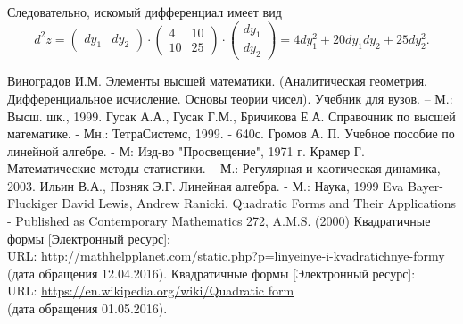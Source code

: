 \documentclass[bachelor, och, coursework, times]{SCWorks}
\begin{document}
Следовательно, искомый дифференциал имеет вид
$$d^2z=
\begin{pmatrix}
dy_1&dy_2
\end{pmatrix}\!\cdot\! 
\begin{pmatrix}
4&10\\
10&25 
\end{pmatrix}\!\cdot\! 
\begin{pmatrix}dy_1\\dy_2\end{pmatrix}= 4dy_1^2+20dy_1dy_2+25dy_2^2.$$

\begin{thebibliography}{00} %
Виноградов И.М. Элементы высшей математики. (Аналитическая геометрия. Дифференциальное исчисление. Основы теории чисел). Учебник для вузов. – М.: Высш. шк., 1999.
Гусак А.А., Гусак Г.М., Бричикова Е.А. Справочник по высшей математике. - Мн.: ТетраСистемс, 1999. - 640с. 
Громов А. П. Учебное пособие по линейной алгебре. - М: Изд-во "Просвещение", 1971 г. 
Крамер Г. Математические методы статистики. – М.: Регулярная и хаотическая динамика, 2003. 
Ильин В.А., Позняк Э.Г. Линейная алгебра. - М.: Наука, 1999
Eva Bayer-Fluckiger David Lewis, Andrew Ranicki. Quadratic Forms and Their Applications - Published as Contemporary Mathematics 272, A.M.S. (2000)
Квадратичные формы [Электронный ресурс]:\\
URL: \href{http://mathhelpplanet.com/static.php?p=linyeinye-i-kvadratichnye-formy}{http://mathhelpplanet.com/static.php?p=linyeinye-i-kvadratichnye-formy} (дата обращения 12.04.2016).
Квадратичные формы [Электронный ресурс]:\\
URL: \href{https://en.wikipedia.org/wiki/Quadratic\underline{ }form}{https://en.wikipedia.org/wiki/Quadratic\underline{ }form} \\ (дата обращения 01.05.2016).

\end{thebibliography}
\end{document}
